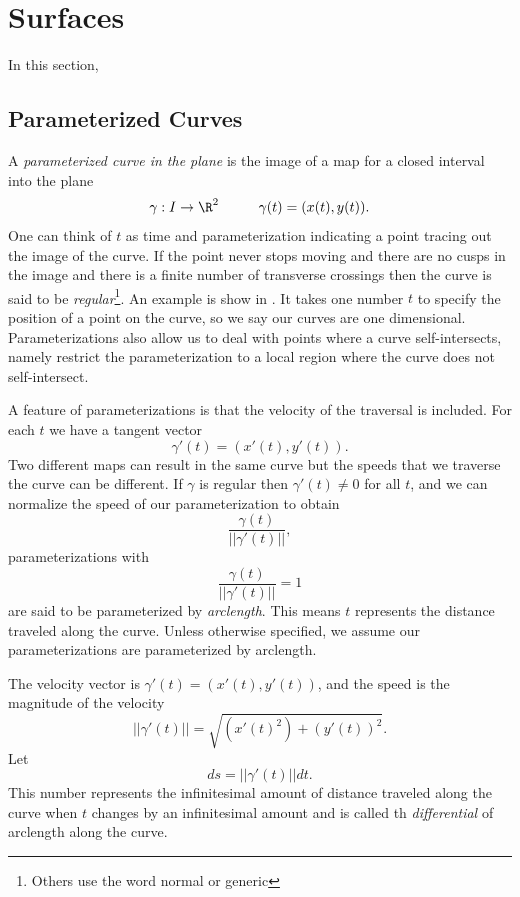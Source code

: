 \section{Surfaces}
\label{sec:polygonal}

In this section, 

\subsection{Parameterized Curves}

A \emph{parameterized curve in the plane} is the image of a map for a closed interval
into the plane
$$\gamma: I\rightarrow \R^2\hspace{1cm} \gamma(t)=(x(t),y(t)).$$ 
One can think of $t$ as time and parameterization indicating a point tracing out the image
of the curve.
If the point never stops moving and there are no cusps in the image and there is a finite number
of transverse crossings then the curve
is said to be \emph{regular}\footnote{Others use the word normal or generic}.
An example is show in .
It takes one number $t$ to specify the position of a point on the curve, so we say our
curves are one dimensional.
Parameterizations also allow us to deal with points where a curve self-intersects, namely 
restrict the parameterization to a local region where the curve does not self-intersect.

A feature of parameterizations is that the velocity of the traversal is included.
For each $t$ we have a tangent vector $$\gamma'(t)=(x'(t),y'(t)).$$
Two different maps can result in the same curve but the speeds that we traverse the curve can be different.
If $\gamma$ is regular then $\gamma'(t)\neq 0$ for all $t$,
and we can normalize the speed of our parameterization
to obtain $$\frac{\gamma(t)}{||\gamma'(t)||},$$ parameterizations with $$\frac{\gamma(t)}{||\gamma'(t)||}=1$$ are said to be parameterized by \emph{arclength}. This means $t$ represents 
the distance traveled along the curve. Unless otherwise specified, we assume our parameterizations are parameterized by arclength.

The velocity vector is $\gamma'(t)=(x'(t),y'(t))$, and the speed is the magnitude of the velocity
$$||\gamma'(t)||=\sqrt{(x'(t)^2)+(y'(t))^2}.$$
Let $$ds=||\gamma'(t)||dt.$$ This number represents the infinitesimal amount of distance traveled along the curve when $t$ changes by an infinitesimal amount and is called th \emph{differential} of arclength along the curve.




